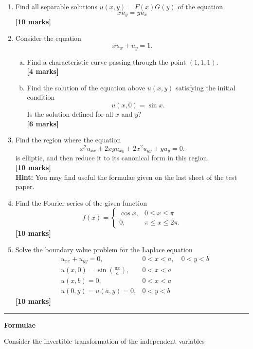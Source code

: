 \documentclass[11pt,a4paper]{article}
\newcommand{\mrk}[1]{\hfill\textbf{[#1 marks]}}
\begin{document}
	\begin{enumerate}
		\item Find all separable solutions $u(x, y) = F(x)G(y)$ of the equation
		$$
		xu_y = yu_x
		$$
		\mrk{10}
		\item Consider the equation
		$$
		xu_x + u_y = 1.
		$$
		\begin{enumerate}[(a)]
			\item Find a characteristic curve passing through the point $(1, 1, 1)$.\\
			\vspace*{0ex}\mrk{4}
			\item Find the solution of the equation above $u(x, y)$ satisfying the initial condition
			$$
			u(x, 0) = \sin x.
			$$
			Is the solution defined for all $x$ and $y$?\\
			\vspace*{0ex}\mrk{6}
		\end{enumerate}
		\item Find the region where the equation
		$$
		x^2u_{xx} + 2xyu_{xy} + 2x^2u_{yy} + yu_y = 0.
		$$
		is elliptic, and then reduce it to its canonical form in this region.\\
		\vspace*{0ex}\mrk{10}\\
		\textbf{Hint:} You may find useful the formulae given on the last sheet of the test paper.
		\item Find the Fourier series of the given function
		$$
		f(x) = 
		\begin{cases}
			\cos x, & 0\leq x \leq \pi\\
			0, & \pi \leq x \leq 2\pi.
		\end{cases}
		$$
		\mrk{10}
		\item Solve the boundary value problem for the Laplace equation
		\begin{align*}
			&u_{xx} + u_{yy} = 0, & 0 < x < a, &\ 0 < y < b\\
			&u(x, 0) = \sin(\frac{\pi x}{a}), & 0 < x < a &\\
			&u(x, b) = 0, & 0 < x < a &\\
			&u(0, y) = u(a, y) = 0, & 0 < y < b &
		\end{align*}
		\mrk{10}
	\end{enumerate}
	\pagebreak
	\thispagestyle{empty}
	\rule{\textwidth}{0.4pt}
	\begin{center}
		\textbf{Formulae}
	\end{center}
	Consider the invertible transformation of the independent variables
\end{document}
